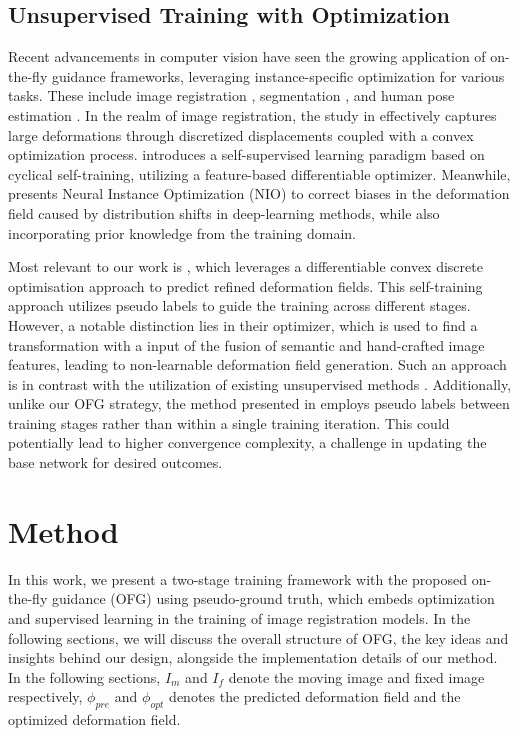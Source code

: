 \documentclass[10pt,twocolumn,letterpaper]{article}
\begin{document}
\subsection{Unsupervised Training with Optimization}

Recent advancements in computer vision have seen the growing application of on-the-fly guidance frameworks, leveraging instance-specific optimization for various tasks. These include image registration \cite{uns2023MICCAI,Def2024Spr}, segmentation \cite{ins2022arx}, and human pose estimation \cite{SPIN}. In the realm of image registration, the study in \cite{fas2022Spr} effectively captures large deformations through discretized displacements coupled with a convex optimization process. \cite{uns2023MICCAI} introduces a self-supervised learning paradigm based on cyclical self-training, utilizing a feature-based differentiable optimizer. Meanwhile, \cite{Def2024Spr} presents Neural Instance Optimization (NIO) to correct biases in the deformation field caused by distribution shifts in deep-learning methods, while also incorporating prior knowledge from the training domain.

Most relevant to our work is \cite{uns2023MICCAI}, which leverages a differentiable convex discrete optimisation approach \cite{lea2022SPR} to predict refined deformation fields. This self-training approach utilizes pseudo labels to guide the training across different stages. However, a notable distinction lies in their optimizer, which is used to find a transformation with a input of the fusion of semantic and hand-crafted image features, leading to non-learnable deformation field generation. Such an approach is in contrast with the utilization of existing unsupervised methods \cite{Balakrishnan_2019,chen2021vitvnet,Chen_2022}. Additionally, unlike our OFG strategy, the method presented in \cite{uns2023MICCAI} employs pseudo labels between training stages rather than within a single training iteration. This could potentially lead to higher convergence complexity, a challenge in updating the base network for desired outcomes.
 \section{Method}\label{sec:method}

In this work, we present a two-stage training framework with the proposed on-the-fly guidance (OFG) using pseudo-ground truth, which embeds optimization and supervised learning in the training of image registration models. In the following sections, we will discuss the overall structure of OFG, the key ideas and insights behind our design, alongside the implementation details of our method. In the following sections, $I_{m}$ and $I_{f}$ denote the moving image and fixed image respectively, $\phi_{pre}$ and $\phi_{opt}$ denotes the predicted deformation field and the optimized deformation field.
\end{document}
